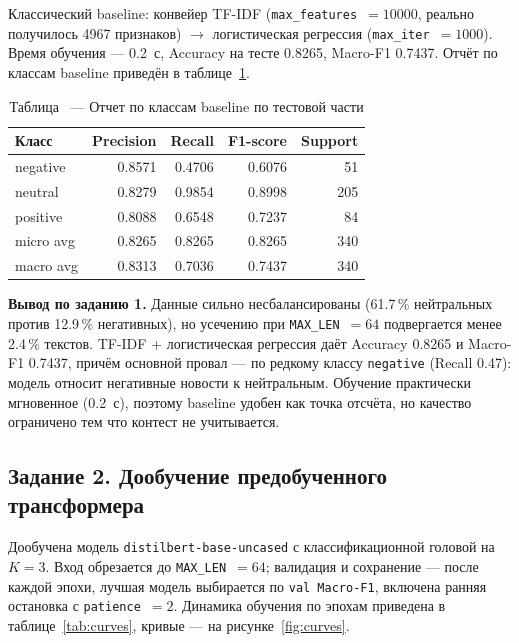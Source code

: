 \documentclass[14pt,a4paper]{extarticle}
\begin{document}
Классический baseline: конвейер TF-IDF (\texttt{max\_features}~$=10000$, реально
получилось 4967 признаков) $\to$ логистическая регрессия
(\texttt{max\_iter}~$=1000$). Время обучения --- 0.2~с, Accuracy на тесте
0.8265, Macro-F1 0.7437. Отчёт по классам baseline приведён в
таблице~\ref{tab:base_report}.

\begin{table}[H]
    \centering
    \caption*{\raggedleft Таблица \thetable\ --- Отчет по классам baseline по тестовой части}
    \label{tab:base_report}
    \begin{tabular}{lrrrr}
        \toprule
        Класс & Precision & Recall & F1-score & Support \\
        \midrule
        negative & 0.8571 & 0.4706 & 0.6076 & 51 \\
        neutral  & 0.8279 & 0.9854 & 0.8998 & 205 \\
        positive & 0.8088 & 0.6548 & 0.7237 & 84 \\
        \midrule
        micro avg & 0.8265 & 0.8265 & 0.8265 & 340 \\
        macro avg & 0.8313 & 0.7036 & 0.7437 & 340 \\
        \bottomrule
    \end{tabular}
\end{table}

\noindent\textbf{Вывод по заданию 1.} Данные сильно несбалансированы (61.7\,\%
нейтральных против 12.9\,\% негативных), но усечению при \texttt{MAX\_LEN}~$=64$
подвергается менее 2.4\,\% текстов. TF-IDF + логистическая регрессия даёт
Accuracy 0.8265 и Macro-F1 0.7437, причём основной провал --- по редкому
классу \texttt{negative} (Recall 0.47): модель относит негативные новости к
нейтральным. Обучение практически мгновенное (0.2~с), поэтому baseline удобен
как точка отсчёта, но качество ограничено тем что контест не учитывается.

\subsection{Задание 2. Дообучение предобученного трансформера}

Дообучена модель \texttt{distilbert-base-uncased} с классификационной головой на
$K=3$. Вход обрезается до \texttt{MAX\_LEN}~$=64$; валидация и сохранение --- после
каждой эпохи, лучшая модель выбирается по \texttt{val Macro-F1}, включена ранняя
остановка с \texttt{patience}~$=2$. Динамика обучения по эпохам приведена в
таблице~\ref{tab:curves}, кривые --- на рисунке~\ref{fig:curves}.
\end{document}
